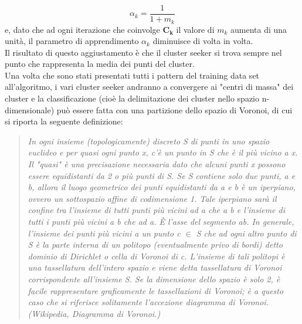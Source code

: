 \begin{equation}
\alpha_k = \frac{1}{1 + m_k}
\end{equation} 
e, dato che ad ogni iterazione che coinvolge $\textbf{C}_\textbf{k}$ il valore di $m_k$ aumenta di una unità, il parametro di apprendimento $\alpha_k$ diminuisce di volta in volta. \\
Il risultato di questo aggiustamento è che il cluster seeker si trova sempre nel punto che rappresenta la media dei punti del cluster. \\
Una volta che sono stati presentati tutti i pattern del training data set all'algoritmo, i vari cluster seeker andranno a convergere ai "centri di massa" dei cluster e la classificazione (cioè la delimitazione dei cluster nello spazio n-dimensionale) può essere fatta con una partizione dello spazio di Voronoi, di cui si riporta la seguente definizione:
\begin{quotation} \small
	\textit{In ogni insieme (topologicamente) discreto S di punti in uno spazio euclideo e per quasi ogni punto x, c'è un punto in S che è il più vicino a x. Il "quasi" è una precisazione necessaria dato che alcuni punti x possono essere equidistanti da 2 o più punti di S.
		Se S contiene solo due punti, a e b, allora il luogo geometrico dei punti equidistanti da a e b è un iperpiano, ovvero un sottospazio affine di codimensione 1. Tale iperpiano sarà il confine tra l'insieme di tutti punti più vicini ad a che a b e l'insieme di tutti i punti più vicini a b che ad a. È l'asse del segmento ab.
		In generale, l'insieme dei punti più vicini a un punto c $\in$ S che ad ogni altro punto di S è la parte interna di un politopo (eventualmente privo di bordi) detto dominio di Dirichlet o cella di Voronoi di c. L'insieme di tali politopi è una tassellatura dell'intero spazio e viene detta tassellatura di Voronoi corrispondente all'insieme S. Se la dimensione dello spazio è solo 2, è facile rappresentare graficamente le tassellazioni di Voronoi; è a questo caso che si riferisce solitamente l'accezione diagramma di Voronoi. \\
		(Wikipedia, Diagramma di Voronoi.)} 
\end{quotation}

